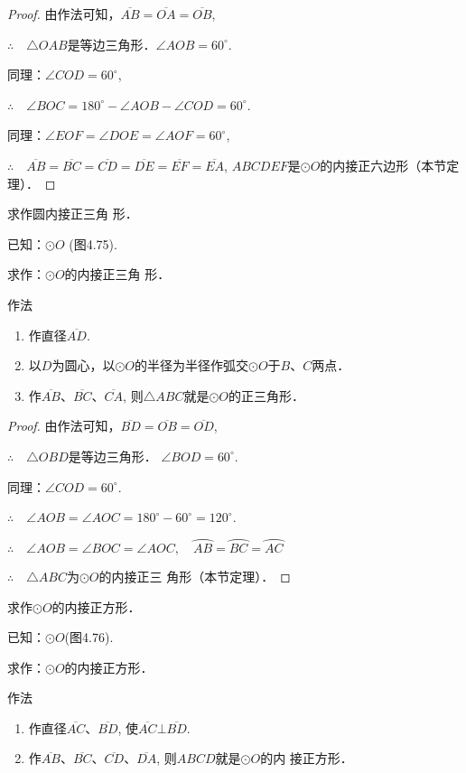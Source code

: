 \begin{proof}
由作法可知，$\overline{AB}=\overline{OA}=\overline{OB}$, 

$\therefore\quad \triangle OAB$是等边三角形．$\angle AOB=60^{\circ}$.

同理：$\angle COD=60^{\circ}$,

$\therefore\quad \angle BOC=180^{\circ}-\angle AOB-\angle COD=60^{\circ}$.

同理：$\angle EOF=\angle DOE=\angle AOF=60^{\circ}$, 

$\therefore\quad \overline{AB}=\overline{BC}=\overline{CD}=\overline{DE}=\overline{EF}=\overline{EA}$, 
$ABCDEF$是$\odot O$的内接正六边形（本节定理）．
\end{proof}

\begin{example}
  求作圆内接正三角
  形．

  已知：$\odot O$ (图4.75).

  求作：$\odot O$的内接正三角
  形．

  作法
\begin{enumerate}
  \item 作直径$\overline{AD}$.
  \item 以$D$为圆心，以$\odot O$的半径为半径作弧交$\odot O$于$B$、$C$两点．
  \item 作$\overline{AB}$、$\overline{BC}$、$\overline{CA}$, 则$\triangle ABC$就是$\odot O$的正三角形．
\end{enumerate}
\end{example}

\begin{proof}
  由作法可知，$\overline{BD}=\overline{OB}=\overline{OD}$,

$\therefore\quad  \triangle OBD$是等边三角形． $\angle BOD=60^{\circ}$.

  同理：$\angle COD=60^{\circ}$.

$\therefore\quad \angle AOB=\angle AOC=180^{\circ}-60^{\circ}=120^{\circ}$.

$\therefore\quad \angle AOB=\angle BOC=\angle AOC,\quad \wideparen{AB}=\wideparen{BC}=\wideparen{AC}$

$\therefore\quad \triangle ABC$为$\odot O$的内接正三
  角形（本节定理）．
\end{proof}

\begin{example}
  求作$\odot O$的内接正方形．

  已知：$\odot O$(图4.76).
  
  求作：$\odot O$的内接正方形．

  作法
\begin{enumerate}
  \item 作直径$\overline{AC}$、$\overline{BD}$, 使$\overline{AC}\bot \overline{BD}$.
  \item 作$\overline{AB}$、$\overline{BC}$、$\overline{CD}$、$\overline{DA}$, 则$ABCD$就是$\odot O$的内
  接正方形．
\end{enumerate}
\end{example}

